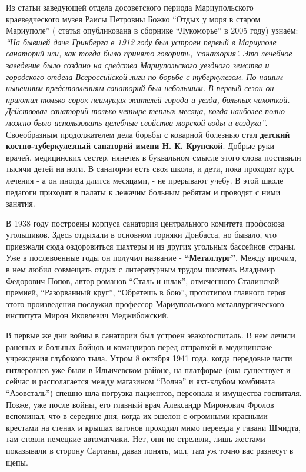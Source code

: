 Из статьи заведующей отдела досоветского периода Мариупольского краеведческого
музея Раисы Петровны Божко \enquote{Отдых у моря в старом Мариуполе} ( статья
опубликована в сборнике \enquote{Лукоморье} в 2005 году) узнаём: \emph{\enquote{На бывшей даче
Гринберга в 1912 году был устроен первый в Мариуполе санаторий или, как тогда
было принято говорить, \enquote{санатория}. Это лечебное заведение было создано на
средства Мариупольского уездного земства и городского отдела Всероссийской лиги
по борьбе с туберкулезом. По нашим нынешним представлениям санаторий был
небольшим. В первый сезон он приютил только сорок неимущих жителей города и
уезда, больных чахоткой. Действовал санаторий только четыре теплых месяца,
когда наиболее полно можно было использовать целебные свойства морской воды и
воздуха}}. Своеобразным продолжателем дела борьбы с коварной болезнью стал
\textbf{детский костно-туберкулезный санаторий имени Н. К. Крупской}. Добрые руки врачей,
медицинских сестер, нянечек в буквальном смысле этого слова поставили тысячи
детей на ноги. В санатории есть своя школа, и дети, пока проходят курс лечения
- а он иногда длится месяцами, - не прерывают учебу. В этой школе педагоги
приходят в палаты к лежачим больным ребятам и проводят с ними занятия.

В 1938 году построены корпуса санатория центрального комитета профсоюза
угольщиков. Здесь отдыхали в основном горняки Донбасса, но бывало, что
приезжали сюда оздоровиться шахтеры и из других угольных бассейнов страны. Уже
в послевоенные годы он получил название - \textbf{\enquote{Металлург}}. Между прочим, в нем
любил совмещать отдых с литературным трудом писатель Владимир Федорович Попов,
автор романов \enquote{Сталь и шлак}, отмеченного Сталинской премией, \enquote{Разорванный
круг}, \enquote{Обретешь в бою}, прототипом главного героя этого произведения послужил
профессор Мариупольского металлургического института Мирон Яковлевич
Меджибожский.


В первые же дни войны в санатории был устроен эвакогоспиталь. В нем лечили
раненых и больных бойцов и командиров перед отправкой в медицинские учреждения
глубокого тыла. Утром 8 октября 1941 года, когда передовые части гитлеровцев
уже были в Ильичевском районе, на платформе (она существует и сейчас и
располагается между магазином \enquote{Волна} и яхт-клубом комбината \enquote{Азовсталь})
спешно шла погрузка пациентов, персонала и имущества госпиталя. Позже, уже
после войны, его главный врач Александр Миронович Фролов вспоминал, что в
середине дня, когда их эшелон с огромными красными крестами на стенах и крышах
вагонов проходил мимо переезда у гавани Шмидта, там стояли немецкие
автоматчики. Нет, они не стреляли, лишь жестами показывали в сторону Сартаны,
давая понять, мол, там уж точно вас разнесут в щепы.

